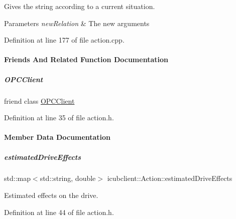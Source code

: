 Gives the string according to a current situation. 


\begin{DoxyParams}{Parameters}
{\em new\+Relation} & The new arguments \\
\hline
\end{DoxyParams}


Definition at line 177 of file action.\+cpp.



\paragraph{Friends And Related Function Documentation}
\mbox{\label{group__icubclient__representations_a80f0caa9925206967111a3d2713874a2}} 
\subparagraph{\texorpdfstring{O\+P\+C\+Client}{OPCClient}}
{\footnotesize\ttfamily friend class \hyperlink{group__icubclient__clients_classicubclient_1_1OPCClient}{O\+P\+C\+Client}\hspace{0.3cm}{\ttfamily [friend]}}



Definition at line 35 of file action.\+h.



\paragraph{Member Data Documentation}
\mbox{\label{group__icubclient__representations_a097956811c22b237972880efab649438}} 
\subparagraph{\texorpdfstring{estimated\+Drive\+Effects}{estimatedDriveEffects}}
{\footnotesize\ttfamily std\+::map$<$std\+::string, double$>$ icubclient\+::\+Action\+::estimated\+Drive\+Effects}



Estimated effects on the drive. 



Definition at line 44 of file action.\+h.

\label{structicubclient_1_1Body}
